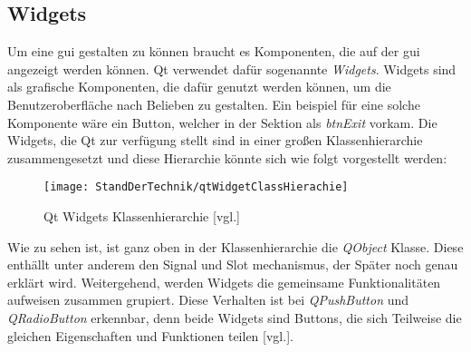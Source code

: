 \subsection{Widgets}
\label{subsec:widgets}
Um eine \ac{gui} gestalten zu können braucht es Komponenten, die auf der \ac{gui} angezeigt
werden können. Qt verwendet dafür sogenannte \emph{Widgets}. Widgets sind als grafische
Komponenten, die dafür genutzt werden können, um die Benutzeroberfläche nach Belieben zu
gestalten. Ein beispiel für eine solche Komponente wäre ein Button, welcher in der Sektion
\emph{} als \emph{btnExit} vorkam.
\newline
\newline
Die Widgets, die Qt zur verfügung stellt sind in einer großen Klassenhierarchie zusammengesetzt
und diese Hierarchie könnte sich wie folgt vorgestellt werden:
\begin{figure}[h]
    \centering
    \texttt{[image: StandDerTechnik/qtWidgetClassHierachie]}
    \caption[Qt Widgets Klassenhierachie]{Qt Widgets Klassenhierarchie
    \cite{GettingStartedQt}[vgl.]}
    \label{img:qtWidgetClassHierachie}
\end{figure}
Wie zu sehen ist, ist ganz oben in der Klassenhierarchie die \emph{QObject} Klasse. Diese
enthällt unter anderem den Signal und Slot mechanismus, der Später noch genau erklärt wird.
Weitergehend, werden Widgets die gemeinsame Funktionalitäten aufweisen zusammen grupiert. Diese
Verhalten ist bei \emph{QPushButton} und \emph{QRadioButton} erkennbar, denn beide Widgets sind
Buttons, die sich Teilweise die gleichen Eigenschaften und Funktionen teilen
\cite{GettingStartedQt}[vgl.].

